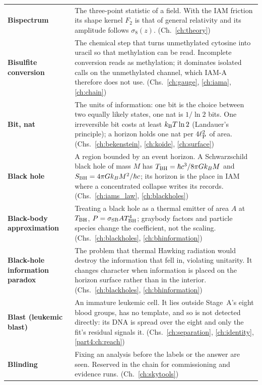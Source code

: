 {\begin{longtable}{@{}>{\raggedright\arraybackslash}p{}>{\raggedright\arraybackslash}p{}@{}}
\textbf{Bispectrum} & The three-point statistic of a field. With the IAM friction its shape kernel $F_2$ is that of general relativity and its amplitude follows $\sigma_8(z)$. {\footnotesize(Ch.~\ref{ch:theory})}\\[1pt]
\textbf{Bisulfite conversion} & The chemical step that turns unmethylated cytosine into uracil so that methylation can be read. Incomplete conversion reads as methylation; it dominates isolated calls on the unmethylated channel, which IAM-A therefore does not use. {\footnotesize(Chs.~\ref{ch:gauge}, \ref{ch:iama}, \ref{ch:chain})}\\[1pt]
\textbf{Bit, nat} & The units of information: one bit is the choice between two equally likely states, one nat is $1/\ln2$ bits. One irreversible bit costs at least $k_{\mathrm B} T\ln2$ (Landauer's principle); a horizon holds one nat per $4\ell_{\mathrm P}^2$ of area. {\footnotesize(Chs.~\ref{ch:bekenstein}, \ref{ch:koide}, \ref{ch:surface})}\\[1pt]
\textbf{Black hole} & A region bounded by an event horizon. A Schwarzschild black hole of mass $M$ has $T_{\rm BH}=\hbar c^3/8\pi Gk_BM$ and $S_{\rm BH}=4\pi Gk_BM^2/\hbar c$; its horizon is the place in IAM where a concentrated collapse writes its records. {\footnotesize(Chs.~\ref{ch:iams_law}, \ref{ch:blackholes})}\\[1pt]
\textbf{Black-body approximation} & Treating a black hole as a thermal emitter of area $A$ at $T_{\rm BH}$, $P=\sigma_{\rm SB}AT_{\rm BH}^4$; graybody factors and particle species change the coefficient, not the scaling. {\footnotesize(Chs.~\ref{ch:blackholes}, \ref{ch:bhinformation})}\\[1pt]
\textbf{Black-hole information paradox} & The problem that thermal Hawking radiation would destroy the information that fell in, violating unitarity. It changes character when information is placed on the horizon surface rather than in the interior. {\footnotesize(Chs.~\ref{ch:blackholes}, \ref{ch:bhinformation})}\\[1pt]
\textbf{Blast (leukemic blast)} & An immature leukemic cell. It lies outside Stage~A's eight blood groups, has no template, and so is not detected directly: its DNA is spread over the eight and only the fit's residual signals it. {\footnotesize(Chs.~\ref{ch:separation}, \ref{ch:identity}, \ref{part4:ch:reach})}\\[1pt]
\textbf{Blinding} & Fixing an analysis before the labels or the answer are seen. Reserved in the chain for commissioning and evidence runs. {\footnotesize(Ch.~\ref{ch:skytools})}\\[1pt]

\end{longtable}}

